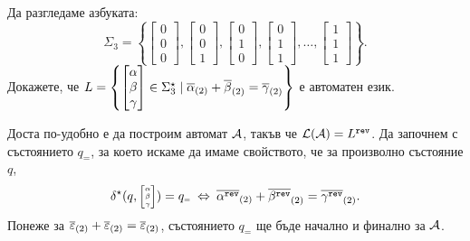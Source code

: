 \begin{extra}
\begin{problem}
  Да разгледаме азбуката:
  \[\Sigma_3 = \left\{\begin{bmatrix} 0\\0\\0\end{bmatrix},\begin{bmatrix} 0\\0\\1\end{bmatrix},\begin{bmatrix} 0\\1\\0\end{bmatrix},\begin{bmatrix} 0\\1\\1\end{bmatrix},\dots,\begin{bmatrix} 1\\1\\1\end{bmatrix}\right\}.\]
  Докажете, че 
  $L = \left\{\begin{bmatrix} \alpha\\\beta\\\gamma\end{bmatrix} \in \Sigma^\star_3 \mid \overline{\alpha}_{(2)}+\overline{\beta}_{(2)} = \overline{\gamma}_{(2)}\right\}$
  е автоматен език.
\end{problem}
\ifhints
\begin{hint}
  Доста по-удобно е да построим автомат $\mathcal{A}$, такъв че $\mathcal{L}(\mathcal{A}) = L^{\texttt{rev}}$.
  Да започнем с състоянието $q_{\scriptscriptstyle{=}}$, за което искаме да имаме свойството, че за произволно състояние $q$,
  \[\delta^\star(q, \tiny{ \begin{bmatrix} \alpha\\ \beta \\ \gamma\end{bmatrix} }) = q_{\scriptscriptstyle{=}}  \ \Leftrightarrow\  \overline{\alpha^{\texttt{rev}}}_{(2)} + \overline{\beta^{\texttt{rev}}}_{(2)} = \overline{\gamma^{\texttt{rev}}}_{(2)}.\]
  Понеже за $\overline{\varepsilon}_{(2)} + \overline{\varepsilon}_{(2)} = \overline{\varepsilon}_{(2)}$, състоянието $q_{\scriptscriptstyle{=}}$ ще бъде начално и финално за $\mathcal{A}$.


\end{hint}
\end{extra}
